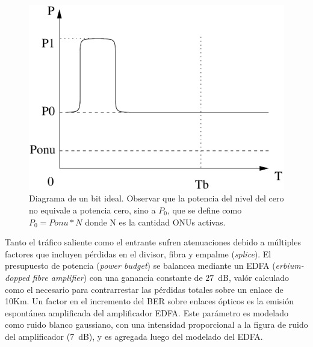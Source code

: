 \begin{figure}[!t]
    \centering
      \includegraphics[width=3.5 in]{graphs/extinction.pdf}
      \caption{Diagrama de un bit ideal. Observar que la potencia del nivel del cero no equivale a potencia cero, sino a $P_0$, que se define como $P_0=Ponu*N$ donde N es la cantidad ONUs activas.}
      \label{sim:extinction}
\end{figure}


Tanto el tráfico saliente como el entrante sufren atenuaciones debido a múltiples factores que incluyen pérdidas en el divisor, fibra y empalme (\textit{splice}). El presupuesto de potencia (\textit{power budget}) se balancea mediante un EDFA (\textit{erbium-dopped fibre amplifier}) con una ganancia constante de $27$~dB, valór calculado como el necesario para contrarrestar las pérdidas totales sobre un enlace de 10Km. Un factor en el incremento del BER sobre enlaces ópticos es  la emisión espontánea amplificada del amplificador EDFA. Este parámetro es modelado como ruido blanco gaussiano, con una intensidad proporcional a la figura de ruido del amplificador ($7$~dB), y es agregada luego del modelado del EDFA.

